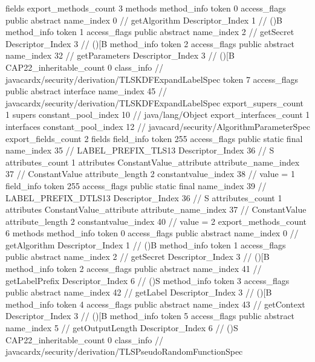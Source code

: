 {{{			fields {
			}
			export_methods_count	3
			methods {
				method_info {
					token	0
					access_flags	public abstract
					name_index	0		// getAlgorithm
					Descriptor_Index	1		// ()B
				}
				method_info {
					token	1
					access_flags	public abstract
					name_index	2		// getSecret
					Descriptor_Index	3		// ()[B
				}
				method_info {
					token	2
					access_flags	public abstract
					name_index	32		// getParameters
					Descriptor_Index	3		// ()[B
				}
			}
			CAP22_inheritable_count	0
		}
		class_info {		// javacardx/security/derivation/TLSKDFExpandLabelSpec
			token	7
			access_flags	public abstract interface
			name_index	45		// javacardx/security/derivation/TLSKDFExpandLabelSpec
			export_supers_count	1
			supers {
				constant_pool_index	10		// java/lang/Object
			}
			export_interfaces_count	1
			interfaces {
				constant_pool_index	12		// javacard/security/AlgorithmParameterSpec
			}
			export_fields_count	2
			fields {
			field_info {
				token	255
				access_flags	public static final
				name_index	35		// LABEL_PREFIX_TLS13
				Descriptor_Index	36		// S
				attributes_count	1
				attributes {
				ConstantValue_attribute {
					attribute_name_index	37		// ConstantValue
					attribute_length	2
					constantvalue_index	38		// value = 1
				}
				}
			}
			field_info {
				token	255
				access_flags	public static final
				name_index	39		// LABEL_PREFIX_DTLS13
				Descriptor_Index	36		// S
				attributes_count	1
				attributes {
				ConstantValue_attribute {
					attribute_name_index	37		// ConstantValue
					attribute_length	2
					constantvalue_index	40		// value = 2
				}
				}
			}
			}
			export_methods_count	6
			methods {
				method_info {
					token	0
					access_flags	public abstract
					name_index	0		// getAlgorithm
					Descriptor_Index	1		// ()B
				}
				method_info {
					token	1
					access_flags	public abstract
					name_index	2		// getSecret
					Descriptor_Index	3		// ()[B
				}
				method_info {
					token	2
					access_flags	public abstract
					name_index	41		// getLabelPrefix
					Descriptor_Index	6		// ()S
				}
				method_info {
					token	3
					access_flags	public abstract
					name_index	42		// getLabel
					Descriptor_Index	3		// ()[B
				}
				method_info {
					token	4
					access_flags	public abstract
					name_index	43		// getContext
					Descriptor_Index	3		// ()[B
				}
				method_info {
					token	5
					access_flags	public abstract
					name_index	5		// getOutputLength
					Descriptor_Index	6		// ()S
				}
			}
			CAP22_inheritable_count	0
		}
		class_info {		// javacardx/security/derivation/TLSPseudoRandomFunctionSpec
}}}
